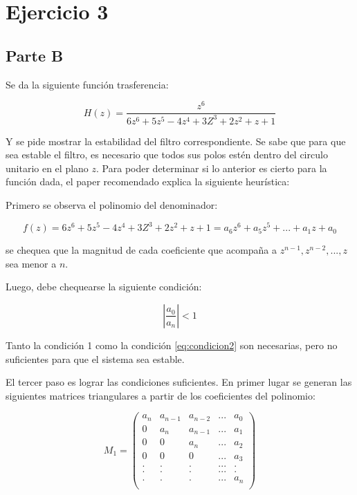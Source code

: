 \chapter*{Ejercicio 3}

\section{Parte B}
Se da la siguiente funci\'on trasferencia:

\begin{equation}
    H(z) = \frac{z^6}{6z^6 + 5z^5 - 4z^4 + 3Z^3 + 2z^2 + z + 1}
\end{equation}

Y se pide mostrar la estabilidad del filtro correspondiente. Se sabe que para que sea estable el filtro, es necesario que todos sus polos est\'en dentro del circulo unitario en el plano $z$. Para poder determinar si lo anterior es cierto para la funci\'on dada, el paper recomendado explica la siguiente heur\'istica:

Primero se observa el polinomio del denominador:

\begin{equation}
    f(z) = 6z^6 + 5z^5 - 4z^4 + 3Z^3 + 2z^2 + z + 1 = a_6z^6 + a_5z^5 + ... + a_1z + a_0
\end{equation}

se chequea que la magnitud de cada coeficiente que acompaña a $z^{n -1}, z^{n - 2}, ..., z$ sea menor a $n$. 

Luego, debe chequearse la siguiente condici\'on:

\begin{equation}\label{eq:condicion2}
    |\frac{a_0}{a_n}| < 1
\end{equation}

Tanto la condici\'on 1 como la condici\'on \ref{eq:condicion2} son necesarias, pero no suficientes para que el sistema sea estable. 

El tercer paso es lograr las condiciones suficientes. En primer lugar se generan las siguientes matrices triangulares a partir de los coeficientes del polinomio:

\begin{equation}\label{eq:matriz1}
    M_1 = \begin{pmatrix}
            a_n & a_{n - 1} & a_{n -2} & ... & a_0\\
            0   & a_n       & a_{n - 1}& ... & a_1\\
            0   & 0         & a_n      & ... & a_2\\
            0   & 0         & 0        & ... & a_3\\
            .   & .         & .        & ... & .  \\
            .   & .         & .        & ... & .  \\
            .   & .         & .        & ... & a_n  \\
            
            \end{pmatrix}
\end{equation}

